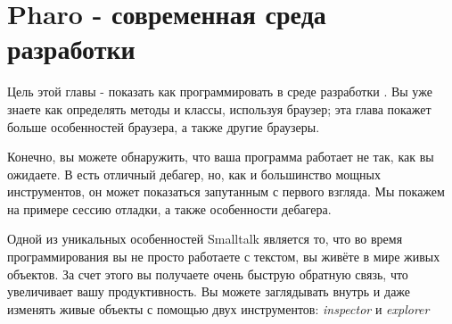 \documentclass[a4paper,10pt,twoside]{book}
\begin{document}
	\sloppy
\fi
\chapter{Pharo - современная среда разработки}


Цель этой главы - показать как программировать в среде разработки  \pharo.
Вы уже знаете как определять методы и классы, используя браузер; эта глава покажет больше особенностей браузера, а также другие браузеры.


Конечно, вы можете обнаружить, что ваша программа работает не так, как вы ожидаете. В \pharo есть отличный дебагер, но, как и большинство мощных инструментов, он может показаться запутанным с первого взгляда. Мы покажем на примере сессию отладки, а также особенности дебагера.


Одной из уникальных особенностей Smalltalk является то, что во время программирования вы не просто работаете с текстом, вы живёте в мире живых объектов. За счет этого вы получаете очень быструю обратную связь, что увеличивает вашу продуктивность. Вы можете  заглядывать внутрь и даже изменять живые объекты с помощью двух инструментов: \emph{inspector} и \emph{explorer}
\end{document}
